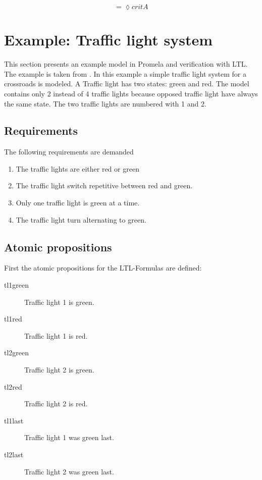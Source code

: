 \documentclass[a4paper, twoside]{article}
\begin{document}
\[
= \lozenge critA
\]

\section{Example: Traffic light system}
\label{sec:example}

This section presents an example model in Promela and verification with LTL. The example is taken from \cite{kleuker09}. In this example a simple traffic light system for a crossroads is modeled. A Traffic light has two states: green and red. The model contains only 2 instead of 4 traffic lights because opposed traffic light have always the same state. The two traffic lights are numbered with 1 and 2.

\subsection{Requirements}
\label{sec:requirements}

The following requirements are demanded
\begin{enumerate}
\item The traffic lights are either red or green
\item The traffic light switch repetitive between red and green.
\item Only one traffic light is green at a time.
\item The traffic light turn alternating to green.
\end{enumerate}

\subsection{Atomic propositions}
\label{sec:trafficlightap}

First the atomic propositions for the LTL-Formulas are defined:

\begin{description}
\item[tl1green] Traffic light 1 is green.
\item[tl1red] Traffic light 1 is red.
\item[tl2green] Traffic light 2 is green.
\item[tl2red] Traffic light 2 is red.
\item[tl1last] Traffic light 1 was green last.
\item[tl2last] Traffic light 2 was green last.
\end{description}
\end{document}

